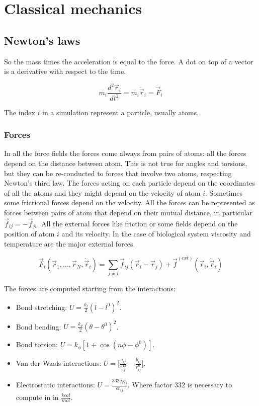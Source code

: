 \chapter{Classical mechanics}

\section{Newton's laws}
So the mass times the acceleration is equal to the force.
A dot on top of a vector is a derivative with respect to the time.

$$m_i\frac{d^2 \vec{r}_i}{dt^2} = m_i\ddot{\vec{r}}_i = \vec{F}_i$$

The index $i$ in a simulation represent a particle, usually atoms.

	\subsection{Forces}
	In all the force fields the forces come always from pairs of atoms: all the forces depend on the distance between atom.
	This is not true for angles and torsions, but they can be re-conducted to forces that involve two atoms, respecting Newton's third law.
	The forces acting on each particle depend on the coordinates of all the atoms and they might depend on the velocity of atom $i$.
	Sometimes some frictional forces depend on the velocity.
	All the forces can be represented as forces between pairs of atom that depend on their mutual distance, in particular $\vec{f}_{ij} = -\vec{f}_{ji}$.
	All the external forces like friction or some fields depend on the position of atom $i$ and its velocity.
	In the case of biological system viscosity and temperature are the major external forces.

	$$\vec{F}_i(\vec{r}_1, \dots, \vec{r}_N, \dot{\vec{r}}_i) = \sum\limits_{j\neq i}\vec{f}_{ij}(\vec{r}_i-\vec{r}_j)+\vec{f}^{(ext)}(\vec{r}_i, \dot{\vec{r}}_i)$$

	The forces are computed starting from the interactions:

	\begin{multicols}{2}
		\begin{itemize}
			\item Bond stretching: $U = \frac{k_l}{2}(l-l^0)^2$.
			\item Bond bending: $U = \frac{k_\theta}{2}(\theta-\theta^0)^2$.
			\item Bond torsion: $U = k_\phi[1+\cos(n\phi-\phi^0)]$.
			\item Van der Waals interactions: $U = \biggl[\frac{a_{ij}}{r_{ij}^{12}}-\frac{b_{ij}}{r_{ij}^6}\biggr]$.
			\item Electrostatic interactions: $U = \frac{332q_iq_j}{\epsilon r_{ij}}$.
				Where factor $332$ is necessary to compute in in $\frac{kcal}{mol}$.
		\end{itemize}
	\end{multicols}

